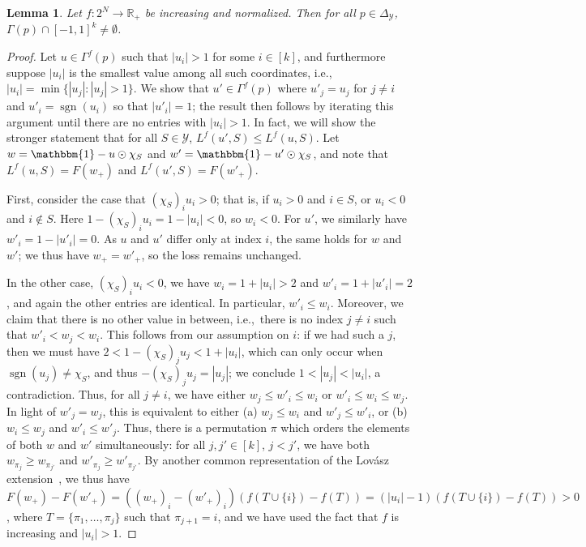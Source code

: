 \documentclass[12pt]{article}
\newcommand{\Comments}{1}
\newcommand{\mytodo}[2]{\ifnum\Comments=1%
  \todo[linecolor=#1!80!black,backgroundcolor=#1,bordercolor=#1!80!black]{#2}\fi}
\newcommand{\jessiet}[1]{\mytodo{teal!20!white}{JF: #1}}
\newcommand{\reals}{\mathbb{R}}
\newcommand{\simplex}{\Delta_\Y}
\newcommand{\Y}{\mathcal{Y}}
\newcommand{\ones}{\mathbbm{1}}
\DeclareMathOperator*{\sgn}{sgn}
\newtheorem{lemma}{Lemma}
\begin{document}
\begin{lemma}
	\label{lem:lovasz-cube}
	Let $f:2^N\to\reals_+$ be increasing and normalized.
	Then for all $p\in\simplex$, $\Gamma(p) \cap [-1,1]^k \neq \emptyset$.
\end{lemma}
\begin{proof}
	Let $u\in\Gamma^f(p)$ such that $|u_i|>1$ for some $i\in [k]$, and furthermore suppose $|u_i|$ is the smallest value among all such coordinates, i.e., $|u_i| = \min\{|u_j| : |u_j| > 1\}$.
	We show that $u'\in\Gamma^f(p)$ where $u'_j = u_j$ for $j\neq i$ and $u'_i = \sgn(u_i)$ so that $|u'_i|=1$; the result then follows by iterating this argument until there are no entries with $|u_i|>1$.
	In fact, we will show the stronger statement that for all $S\in\Y$, $L^f(u',S) \leq L^f(u,S)$.
	Let $w = \ones - u\odot \chi_S$ and $w' = \ones - u'\odot \chi_S$, and note that $L^f(u,S) = F(w_+)$ and $L^f(u',S) = F(w'_+)$.
	
	First, consider the case that $(\chi_S)_iu_i > 0$; that is, if $u_i > 0$ and $i\in S$, or $u_i < 0$ and $i\notin S$.
	Here $1-(\chi_S)_iu_i = 1-|u_i| < 0$, so $w_i < 0$.
	For $u'$, we similarly have $w'_i = 1-|u'_i| = 0$.
	As $u$ and $u'$ differ only at index $i$, the same holds for $w$ and $w'$; we thus have $w_+ = w'_+$, so the loss remains unchanged.
	
	In the other case, $(\chi_S)_iu_i < 0$, we have $w_i = 1+|u_i| > 2$ and $w'_i = 1+|u'_i| = 2$, and again the other entries are identical.
	In particular, $w'_i \leq w_i$.
	Moreover, we claim that there is no other value in between, i.e.,\ there is no index $j\neq i$ such that $w'_i < w_j < w_i$.
	This follows from our assumption on $i$: if we had such a $j$, then we must have $2 < 1 - (\chi_S)_ju_j < 1 + |u_i|$, which can only occur when $\sgn(u_j) \neq \chi_S$, and thus $-(\chi_S)_ju_j = |u_j|$; we conclude $1 < |u_j| < |u_i|$, a contradiction.
	Thus, for all $j\neq i$, we have either $w_j \leq w'_i \leq w_i$ or $w'_i \leq w_i \leq w_j$.
	In light of $w'_j = w_j$, this is equivalent to either (a) $w_j \leq w_i$ and $w'_j \leq w'_i$, or (b) $w_i \leq w_j$ and $w'_i \leq w'_j$.
	Thus, there is a permutation $\pi$ which orders the elements of both $w$ and $w'$ simultaneously: for all $j,j'\in [k]$, $j<j'$, we have both $w_{\pi_j} \geq w_{\pi_{j'}}$ and $w'_{\pi_j} \geq w'_{\pi_{j'}}$.
	By another common representation of the Lov\'asz extension~\cite[Equation 3.1]{bach2013learning}, we thus have $F(w_+) - F(w'_+) = ((w_+)_i - (w'_+)_i)(f(T\cup\{i\})-f(T)) = (|u_i|-1)(f(T\cup\{i\})-f(T)) > 0$,
	where $T = \{\pi_1,\ldots,\pi_j\}$ such that $\pi_{j+1} = i$, and we have used the fact that $f$ is increasing and $|u_i|>1$.
\end{proof}
\end{document}
